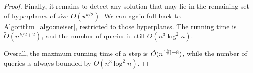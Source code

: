 \begin{proof}
Finally, it remains to detect any solution that may lie in the remaining
set of hyperplanes of size $O(n^{k/2})$. We can again fall back
to Algorithm~\ref{algo:meiser}, restricted to those hyperplanes. The running
time is $\tilde{O}(n^{k/2 + 2})$, and the number of queries is still
$O(n^3 \log^2 n)$.

Overall, the maximum running time of a step is $\tilde{O}(n^{\lceil\frac{k}{2}\rceil + 8})$,
while the number of queries is always bounded by $O(n^3\log^2 n)$.

\end{proof}


